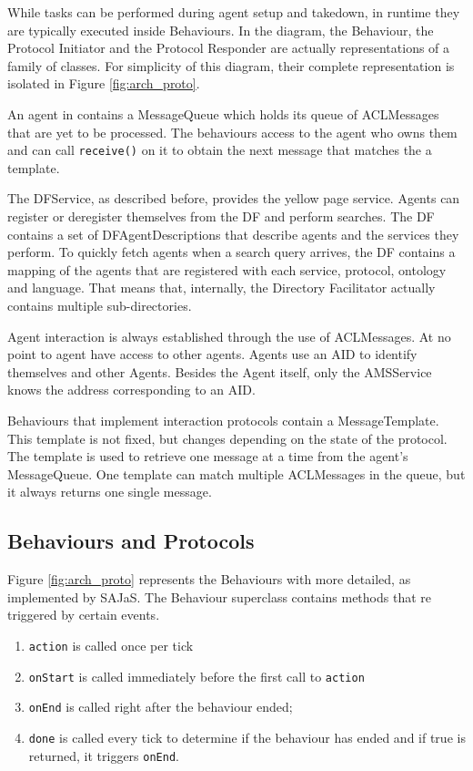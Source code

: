 While tasks can be performed during agent setup and takedown, in runtime they are typically executed inside Behaviours. In the diagram, the Behaviour, the Protocol Initiator and the Protocol Responder are actually representations of a family of classes. For simplicity of this diagram, their complete representation is isolated in Figure \ref{fig:arch_proto}.

An agent in \apiname{} contains a MessageQueue which holds its queue of ACLMessages that are yet to be processed. The behaviours access to the agent who owns them and can call \texttt{receive()} on it to obtain the next message that matches the a template.

The DFService, as described before, provides the yellow page service. Agents can register or deregister themselves from the DF and perform searches. The DF contains a set of DFAgentDescriptions that describe agents and the services they perform. To quickly fetch agents when a search query arrives, the DF contains a mapping of the agents that are registered with each service, protocol, ontology and language. That means that, internally, the Directory Facilitator actually contains multiple sub-directories.

Agent interaction is always established through the use of ACLMessages. At no point to agent have access to other agents. Agents use an AID to identify themselves and other Agents. Besides the Agent itself, only the AMSService knows the address corresponding to an AID.

Behaviours that implement interaction protocols contain a MessageTemplate. This template is not fixed, but changes depending on the state of the protocol. The template is used to retrieve one message at a time from the agent's MessageQueue. One template can match multiple ACLMessages in the queue, but it always returns one single message.

\subsection{Behaviours and Protocols}
\label{sec:arch_behaviours}
Figure \ref{fig:arch_proto} represents the Behaviours with more detailed, as implemented by SAJaS. The Behaviour superclass contains methods that re triggered by certain events.

\begin{enumerate}
	\item \texttt{action} is called once per tick
	\item \texttt{onStart} is called immediately before the first call to \texttt{action}
	\item \texttt{onEnd} is called right after the behaviour ended;
	\item \texttt{done} is called every tick to determine if the behaviour has ended and if true is returned, it triggers \texttt{onEnd}.
\end{enumerate}

